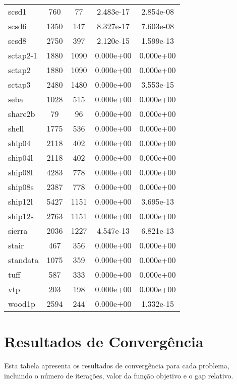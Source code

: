 \documentclass[12pt]{article}
\begin{document}
\begin{longtable}{@{}l|cccc@{}}
scsd1 & 760 & 77 & 2.483e-17 & 2.854e-08 \\
scsd6 & 1350 & 147 & 8.327e-17 & 7.603e-08 \\
scsd8 & 2750 & 397 & 2.120e-15 & 1.599e-13 \\
sctap2-1 & 1880 & 1090 & 0.000e+00 & 0.000e+00 \\
sctap2 & 1880 & 1090 & 0.000e+00 & 0.000e+00 \\
sctap3 & 2480 & 1480 & 0.000e+00 & 3.553e-15 \\
seba & 1028 & 515 & 0.000e+00 & 0.000e+00 \\
share2b & 79 & 96 & 0.000e+00 & 0.000e+00 \\
shell & 1775 & 536 & 0.000e+00 & 0.000e+00 \\
ship04 & 2118 & 402 & 0.000e+00 & 0.000e+00 \\
ship04l & 2118 & 402 & 0.000e+00 & 0.000e+00 \\
ship08l & 4283 & 778 & 0.000e+00 & 0.000e+00 \\
ship08s & 2387 & 778 & 0.000e+00 & 0.000e+00 \\
ship12l & 5427 & 1151 & 0.000e+00 & 3.695e-13 \\
ship12s & 2763 & 1151 & 0.000e+00 & 0.000e+00 \\
sierra & 2036 & 1227 & 4.547e-13 & 6.821e-13 \\
stair & 467 & 356 & 0.000e+00 & 0.000e+00 \\
standata & 1075 & 359 & 0.000e+00 & 0.000e+00 \\
tuff & 587 & 333 & 0.000e+00 & 0.000e+00 \\
vtp & 203 & 198 & 0.000e+00 & 0.000e+00 \\
wood1p & 2594 & 244 & 0.000e+00 & 1.332e-15 \\

\bottomrule
\end{longtable}

\section{Resultados de Convergência}

Esta tabela apresenta os resultados de convergência para cada problema, incluindo o número de iterações, valor da função objetivo e o gap relativo.
\end{document}
